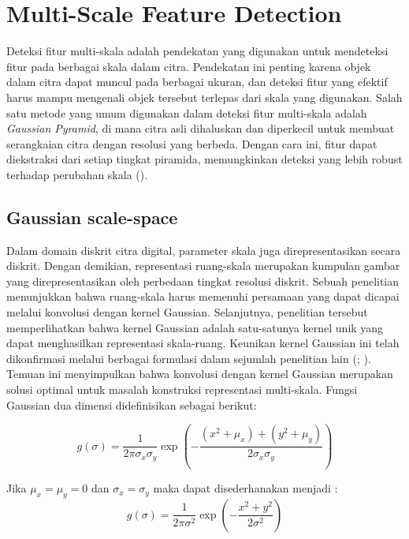 \section{Multi-Scale Feature Detection}
  Deteksi fitur multi-skala adalah pendekatan yang digunakan untuk mendeteksi fitur pada berbagai skala dalam citra. Pendekatan ini penting karena objek dalam citra dapat muncul pada berbagai ukuran, dan deteksi fitur yang efektif harus mampu mengenali objek tersebut terlepas dari skala yang digunakan. Salah satu metode yang umum digunakan dalam deteksi fitur multi-skala adalah \emph{Gaussian Pyramid}, di mana citra asli dihaluskan dan diperkecil untuk membuat serangkaian citra dengan resolusi yang berbeda. Dengan cara ini, fitur dapat diekstraksi dari setiap tingkat piramida, memungkinkan deteksi yang lebih robust terhadap perubahan skala (\cite[hlm. 91--92]{Lowe2004}).

\subsection{Gaussian scale-space}

Dalam domain diskrit citra digital, parameter skala juga direpresentasikan secara diskrit. 
Dengan demikian, representasi ruang-skala merupakan kumpulan gambar yang direpresentasikan oleh perbedaan tingkat resolusi diskrit. 
Sebuah penelitian menunjukkan bahwa ruang-skala harus memenuhi persamaan yang dapat dicapai melalui konvolusi dengan kernel Gaussian. 
Selanjutnya, penelitian tersebut memperlihatkan bahwa kernel Gaussian adalah satu-satunya kernel unik yang dapat menghasilkan representasi skala-ruang. 
Keunikan kernel Gaussian ini telah dikonfirmasi melalui berbagai formulasi dalam sejumlah penelitian lain (\cite[hlm. 92--93]{Lowe2004}; \cite[hlm. 13--15]{mikolajczyk:tel-00584096}). 
Temuan ini menyimpulkan bahwa konvolusi dengan kernel Gaussian merupakan solusi optimal untuk masalah konstruksi representasi multi-skala. Fungsi Gaussian dua dimensi didefinisikan sebagai berikut:

\begin{equation*}
g(\sigma) = \frac{1}{2\pi\sigma_{x}\sigma_{y}}\exp\left(-\frac{(x^2+\mu_{x})+(y^2+\mu_{y})}{2\sigma_{x}\sigma_{y}}\right)
\end{equation*}

Jika \(\mu_{x} = \mu_{y} = 0\) dan \(\sigma_{x} = \sigma_{y}\) maka dapat disederhanakan menjadi :
\begin{equation}
g(\sigma) = \frac{1}{2\pi\sigma^2}\exp\left(-\frac{x^2+y^2}{2\sigma^2}\right)
\label{eq:gaussian kernel}
\end{equation}

